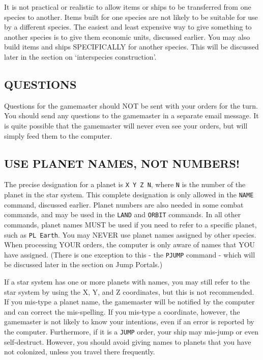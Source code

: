 \documentclass[10pt,titlepage]{article}
\begin{document}
It is not practical or realistic to allow items or ships to be transferred from
one species to another.  Items built for one species are not likely to be
suitable for use by a different species.  The easiest and least expensive way
to give something to another species is to give them economic units, discussed
earlier.  You may also build items and ships SPECIFICALLY for another species.
This will be discussed later in the section on `interspecies construction'.


\subsection{QUESTIONS}
\label{sec:questions}


Questions for the gamemaster should NOT be sent with your orders for the turn.
You should send any questions to the gamemaster in a separate email message.
It is quite possible that the gamemaster will never even see your orders, but
will simply feed them to the computer.


\subsection{USE PLANET NAMES, NOT NUMBERS!}
\label{sec:planetnamesnotnumbers}


The precise designation for a planet is \texttt{X Y Z N}, where \texttt{N} is the number of
the planet in the star system.  This complete designation is only allowed in
the \texttt{NAME} command, discussed earlier.  Planet numbers are also needed in some
combat commands, and may be used in the \texttt{LAND} and \texttt{ORBIT} commands.  In all other
commands, planet names MUST be used if you need to refer to a specific planet,
such as \texttt{PL Earth}.  You may NEVER use planet names assigned by other species.
When processing YOUR orders, the computer is only aware of names that YOU have
assigned.  (There is one exception to this - the \texttt{PJUMP} command - which will be
discussed later in the section on Jump Portals.)

If a star system has one or more planets with names, you may still refer to the
star system by using the X, Y, and Z coordinates, but this is not recommended.
If you mis-type a planet name, the gamemaster will be notified by the computer
and can correct the mis-spelling.  If you mis-type a coordinate, however, the
gamemaster is not likely to know your intentions, even if an error is reported
by the computer.  Furthermore, if it is a \texttt{JUMP} order, your ship may mis-jump or
even self-destruct.  However, you should avoid giving names to planets that you
have not colonized, unless you travel there frequently.
\end{document}
